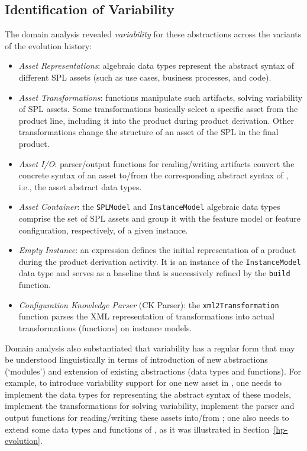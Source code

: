 
\subsection{Identification of Variability} 
\label{variability}

The domain analysis revealed \emph{variability} for these abstractions across the variants of the evolution history:

\begin{itemize}

\item \emph{Asset Representations}: algebraic data types represent the abstract syntax of different SPL assets (such as use cases, business processes, and code).

\item \emph{Asset Transformations}: functions manipulate such artifacts, solving variability of SPL assets. Some transformations basically select a specific asset from the product line, including it into the product during product derivation. Other transformations change the structure of an asset of the SPL in the final product.

\item \emph{Asset I/O}: parser/output functions for reading/writing artifacts convert the concrete syntax of an asset to/from the corresponding abstract syntax of \hpl{}, i.e., the asset abstract data types.

\item \emph{Asset Container}: the \texttt{SPLModel} and \texttt{InstanceModel} algebraic data types comprise the set of SPL assets and group it with the feature model or feature configuration, respectively, of a given \hpl{} instance.

\item \emph{Empty Instance}: an expression defines the initial representation of a product during the product derivation activity. It is an instance of the \texttt{InstanceModel} data type and serves as a baseline that is successively refined by the \texttt{build} function.

\item \emph{Configuration Knowledge Parser} (CK Parser): the \texttt{xml2Transformation} function parses the XML representation of transformations into actual transformations (functions) on instance models.

\end{itemize}

Domain analysis also substantiated that variability has a regular form that may be understood linguistically in terms of introduction of new abstractions (`modules') and extension of existing abstractions (data types and functions). For example, to introduce variability support for one new asset in \hp, one needs to implement the data types for representing the abstract syntax of these models, implement the transformations for solving variability, implement the parser and output functions for reading/writing these assets into/from \hp; one also needs to extend some data types and functions of \hp{}, as it was illustrated in Section~\ref{hp-evolution}.
